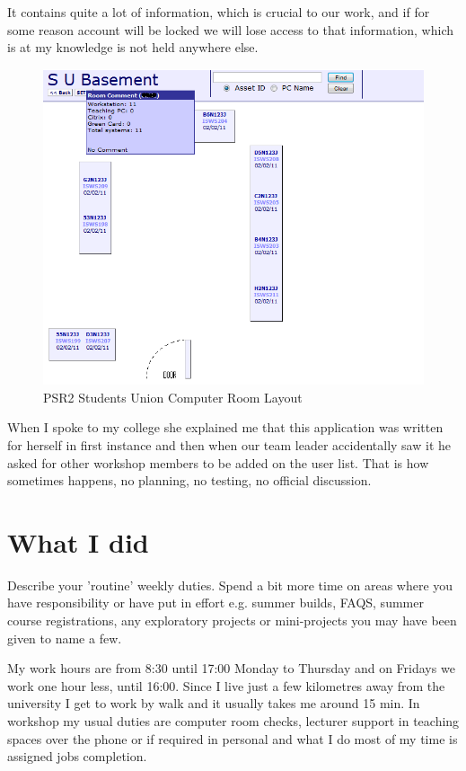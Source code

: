\documentclass[10pt,a4paper,headinclude=true]{report}
\begin{document}
 It contains quite a lot of information, which is crucial to our work, and if for some reason account will be locked we will lose access to that information, which is at my knowledge is not held anywhere else.

\begin{figure}[H]
\includegraphics[scale=0.5]{./PSR2_SU_Room_layout}
\caption{PSR2 Students Union Computer Room Layout}
\label{fig:PSR2_SU_Room_layout}
\end{figure}

When I spoke to my college she explained me that this application was written for herself in first instance and then when our team leader accidentally saw it he asked for other workshop members to be added on the user list. That is how sometimes happens, no planning, no testing, no official discussion.
\chapter{What I did}
Describe your 'routine' weekly duties. Spend a bit more time on areas where you have
responsibility or have put in effort e.g. summer builds, FAQS, summer course
registrations, any exploratory projects or mini-projects you may have been given to
name a few.

My work hours are from 8:30 until 17:00 Monday to Thursday and on Fridays we work one hour less, until 16:00. Since I live just a few kilometres away from the university I get to work by walk and it usually takes me around 15 min. In workshop my usual duties are computer room checks, lecturer support in teaching spaces over the phone or if required in personal and what I do most of my time is assigned jobs completion.
\end{document}
